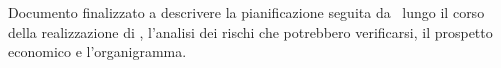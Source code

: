 Documento finalizzato a descrivere la pianificazione seguita da \gruppo\ lungo il corso della realizzazione di \progetto,
l'analisi dei rischi che potrebbero verificarsi, il prospetto economico e l'organigramma.